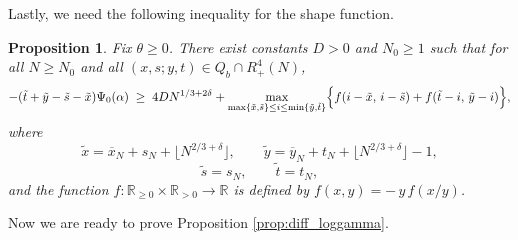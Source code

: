\documentclass[11pt]{article}
\newtheorem{proposition}[theorem]{Proposition}
\theoremstyle{definition}
\newcommand{\R}{\mathbb{R}}
\begin{document}
Lastly, we need the following inequality for the shape function.
\begin{proposition}\label{prop:shape_function}
Fix $\theta \geq 0$. There exist constants $D>0$ and $N_0\ge1$ such that for all $N\ge N_0$
and all $(x,s;y,t)\in Q_b \cap R_+^4(N)$,
\begin{equation}\label{eq:key_bound}
-(\tilde t + \tilde{y}-\tilde s - \tilde{x})\Psi_0(\alpha)
\;\ge\;
4D N^{1/3+2\delta}
+\max_{\max\{\tilde{x}, \tilde{s}\}\leq i \leq \min\{\tilde{y}, \tilde{t}\}}
\Bigl\{
f(i-\tilde x,\, i-\tilde s)
+
f(\tilde t-i,\, \tilde y-i)
\Bigr\},
\end{equation}
where
\[
\tilde x=\overline{x}_N+s_N+\lfloor N^{2/3+\delta}\rfloor,\qquad
\tilde y=\overline{y}_N+t_N+\lfloor N^{2/3+\delta}\rfloor-1,
\]
\[
\tilde s=s_N,\qquad
\tilde t=t_N,
\]
and the function $f:\mathbb R_{\geq 0} \times \R_{>0}\to\mathbb R$ is defined by $f(x,y)= -\,y\,f(x/y)$.
\end{proposition}
Now we are ready to prove Proposition \ref{prop:diff_loggamma}.
\end{document}
